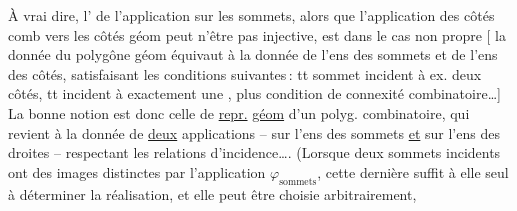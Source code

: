 À vrai dire, l' de l'application sur
les sommets, alors que l'application  des
côtés comb vers les côtés géom peut
n'être pas injective, est 
dans le cas non propre [  la donnée
du polygône géom  équivaut à la donnée
de l'ens des sommets et de l'ens
des côtés, satisfaisant les conditions suivantes\,: 
tt sommet incident à ex. deux côtés, tt
 incident à exactement une ,
 plus condition de connexité combinatoire\ldots]
La bonne notion est
donc celle de \uline{repr.}  \uline{géom} d'un polyg.
combinatoire, qui revient à la donnée
de \uline{deux} applications -- sur l'ens des
sommets \uline{et} sur l'ens des droites --
respectant les relations d'incidence\ldots.
(Lorsque deux sommets incidents ont
  des images
 distinctes
par l'application $\varphi_{\mathrm{sommets}}$, cette dernière
suffit à elle seul à déterminer la réalisation,
et elle peut être choisie arbitrairement,


